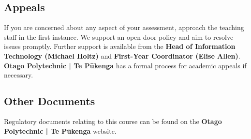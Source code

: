 \documentclass{article}
\begin{document}
\subsection*{Appeals}
If you are concerned about any aspect of your assessment, approach the teaching staff in the first instance. We support an open-door policy and aim to resolve issues promptly. Further support is available from the \textbf{Head of Information Technology (Michael Holtz)} and \textbf{First-Year Coordinator (Elise Allen)}. \textbf{Otago Polytechnic | Te Pūkenga} has a formal process for academic appeals if necessary.

\subsection*{Other Documents}
Regulatory documents relating to this course can be found on the \textbf{Otago Polytechnic | Te Pūkenga} website.
\end{document}
